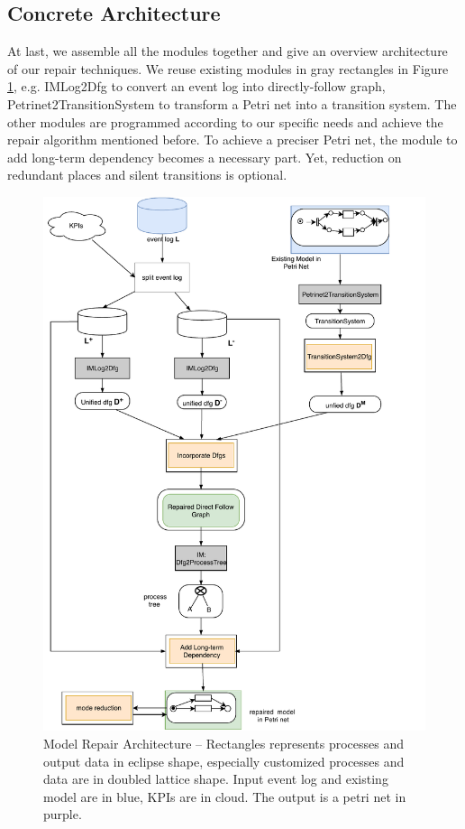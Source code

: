 \subsection{Concrete Architecture}
At last, we assemble all the modules together and give an overview architecture of our repair techniques.  We reuse existing modules in gray rectangles in Figure \ref{fig:architecture}, e.g. IMLog2Dfg to convert an event log into directly-follow graph, Petrinet2TransitionSystem to transform a Petri net into a transition system. The other modules are programmed according to our specific needs and achieve the repair algorithm mentioned before. To achieve a preciser Petri net, the module to add long-term dependency becomes a necessary part. Yet, reduction on redundant places and silent transitions is optional. 
\begin{figure}
	\includegraphics[height=0.9\textheight]{figures/algorithm/FD_architeccture_details.pdf}
	\caption[Model Repair Architecture]{Model Repair Architecture -- \small Rectangles represents processes and output data in eclipse shape, especially customized processes and data are in doubled lattice shape. Input event log and existing model are in blue, KPIs are in cloud. The output is a petri net in purple.}
	\label{fig:architecture}
\end{figure} 
